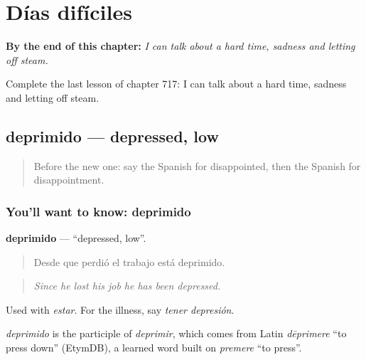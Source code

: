 
\chapter{Días difíciles}
\label{ch:es-dias-dificiles}

\begin{chapteropening}
\textbf{By the end of this chapter:} \emph{I can talk about a hard time, sadness and letting off steam.}

Complete the last lesson of chapter 717: I can talk about a hard time, sadness and letting off steam.
\end{chapteropening}

\section[deprimido]{deprimido — depressed, low}

\label{lesson:ES-C717-deprimido}



\begin{quote}
Before the new one: say the Spanish for disappointed, then the Spanish for disappointment.
\end{quote}

\subsection*{You'll want to know: deprimido}
\textbf{deprimido} — \textquotedblleft{}depressed, low\textquotedblright{}.

\begin{quote}
Desde que perdió el trabajo está deprimido.
\end{quote}

\begin{quote}
\emph{Since he lost his job he has been depressed.}
\end{quote}

Used with \emph{estar}. For the illness, say \emph{tener depresión}.

\begin{cousinweb}
\emph{deprimido} is the participle of \emph{deprimir}, which comes from Latin \emph{dēprimere} \textquotedblleft{}to press down\textquotedblright{} (EtymDB), a learned word built on \emph{premere} \textquotedblleft{}to press\textquotedblright{}.
\end{cousinweb}

